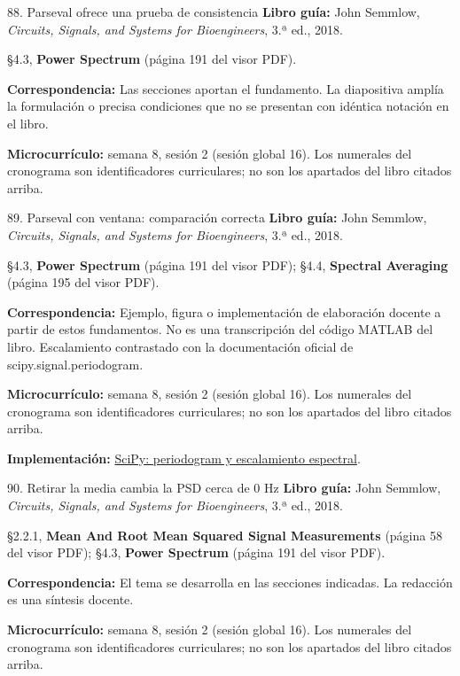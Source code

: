 \documentclass[
  10pt,
  ignorenonframetext,
  aspectratio=169,
  spanish,
]{beamer}
\begin{document}
\begin{frame}{88. Parseval ofrece una prueba de consistencia}
\label{parseval-ofrece-una-prueba-de-consistencia}
\textbf{Libro guía:} John Semmlow, \emph{Circuits, Signals, and Systems
for Bioengineers}, 3.ª ed., 2018.

§4.3, \textbf{Power Spectrum} (página 191 del visor PDF).

\textbf{Correspondencia:} Las secciones aportan el fundamento. La
diapositiva amplía la formulación o precisa condiciones que no se
presentan con idéntica notación en el libro.

\textbf{Microcurrículo:} semana 8, sesión 2 (sesión global 16). Los
numerales del cronograma son identificadores curriculares; no son los
apartados del libro citados arriba.
\end{frame}

\begin{frame}{89. Parseval con ventana: comparación correcta}
\label{parseval-con-ventana-comparaciuxf3n-correcta}
\textbf{Libro guía:} John Semmlow, \emph{Circuits, Signals, and Systems
for Bioengineers}, 3.ª ed., 2018.

§4.3, \textbf{Power Spectrum} (página 191 del visor PDF); §4.4,
\textbf{Spectral Averaging} (página 195 del visor PDF).

\textbf{Correspondencia:} Ejemplo, figura o implementación de
elaboración docente a partir de estos fundamentos. No es una
transcripción del código MATLAB del libro. Escalamiento contrastado con
la documentación oficial de scipy.signal.periodogram.

\textbf{Microcurrículo:} semana 8, sesión 2 (sesión global 16). Los
numerales del cronograma son identificadores curriculares; no son los
apartados del libro citados arriba.

\textbf{Implementación:}
\href{https://docs.scipy.org/doc/scipy/reference/generated/scipy.signal.periodogram.html}{SciPy:
periodogram y escalamiento espectral}.
\end{frame}

\begin{frame}{90. Retirar la media cambia la PSD cerca de 0 Hz}
\label{retirar-la-media-cambia-la-psd-cerca-de-0-hz}
\textbf{Libro guía:} John Semmlow, \emph{Circuits, Signals, and Systems
for Bioengineers}, 3.ª ed., 2018.

§2.2.1, \textbf{Mean And Root Mean Squared Signal Measurements} (página
58 del visor PDF); §4.3, \textbf{Power Spectrum} (página 191 del visor
PDF).

\textbf{Correspondencia:} El tema se desarrolla en las secciones
indicadas. La redacción es una síntesis docente.

\textbf{Microcurrículo:} semana 8, sesión 2 (sesión global 16). Los
numerales del cronograma son identificadores curriculares; no son los
apartados del libro citados arriba.
\end{frame}
\end{document}
